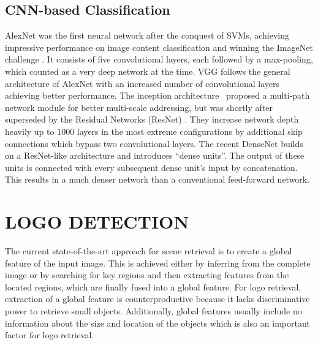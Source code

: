 \documentclass[a4paper,twoside]{article}
\begin{document}
\subsection{\acs{CNN}-based Classification}
AlexNet \cite{krizhevsky2012b} was the first neural network after the conquest of \acp{SVM}, achieving impressive performance on image content classification and winning the ImageNet challenge \cite{deng2009}. It consists of five convolutional layers, each followed by a max-pooling, which counted as a very deep network at the time. 
VGG \cite{simonyan2014} follows the general architecture of AlexNet with an increased number of convolutional layers achieving better performance. 
The inception architecture~\cite{szegedy2015} proposed a multi-path network module for better multi-scale addressing, but was shortly after superseded by the Residual Networks (ResNet) \cite{he2015,he2016}. They increase network depth heavily up to 1000 layers in the most extreme configurations by additional skip connections which bypass two convolutional layers. 
The recent DenseNet \cite{huang2016} builds on a ResNet-like architecture and introduces ``dense units''. The output of these units is connected with every subsequent dense unit's input by concatenation. This results in a much denser network than a conventional feed-forward network.


\section{\uppercase{Logo Detection}}
\noindent The current state-of-the-art approach for scene retrieval is to create a global feature of the input image. This is achieved either by inferring from the complete image or by searching for key regions and then extracting features from the located regions, which are finally fused into a global feature. For logo retrieval, extraction of a global feature is counterproductive because it lacks discriminative power to retrieve small objects. Additionally, global features usually include no information about the size and location of the objects which is also an important factor for logo retrieval.
\end{document}
